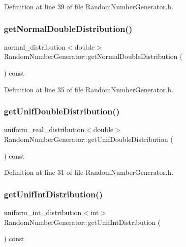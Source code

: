 Definition at line 39 of file Random\+Number\+Generator.\+h.

\mbox{\label{class_random_number_generator_a00c87143dea0833fc03370c09b1c4578}} 
\subsubsection{get\+Normal\+Double\+Distribution()}
{\footnotesize\ttfamily normal\+\_\+distribution$<$double$>$ Random\+Number\+Generator\+::get\+Normal\+Double\+Distribution (\begin{DoxyParamCaption}{ }\end{DoxyParamCaption}) const\hspace{0.3cm}{\ttfamily [inline]}}



Definition at line 35 of file Random\+Number\+Generator.\+h.

\mbox{\label{class_random_number_generator_aff9f8880d7a793787a500ad7aa8ac453}} 
\subsubsection{get\+Unif\+Double\+Distribution()}
{\footnotesize\ttfamily uniform\+\_\+real\+\_\+distribution$<$double$>$ Random\+Number\+Generator\+::get\+Unif\+Double\+Distribution (\begin{DoxyParamCaption}{ }\end{DoxyParamCaption}) const\hspace{0.3cm}{\ttfamily [inline]}}



Definition at line 31 of file Random\+Number\+Generator.\+h.

\mbox{\label{class_random_number_generator_a1055b1b761b18a73c7742bcdd06e388e}} 
\subsubsection{get\+Unif\+Int\+Distribution()}
{\footnotesize\ttfamily uniform\+\_\+int\+\_\+distribution$<$int$>$ Random\+Number\+Generator\+::get\+Unif\+Int\+Distribution (\begin{DoxyParamCaption}{ }\end{DoxyParamCaption}) const\hspace{0.3cm}{\ttfamily [inline]}}



